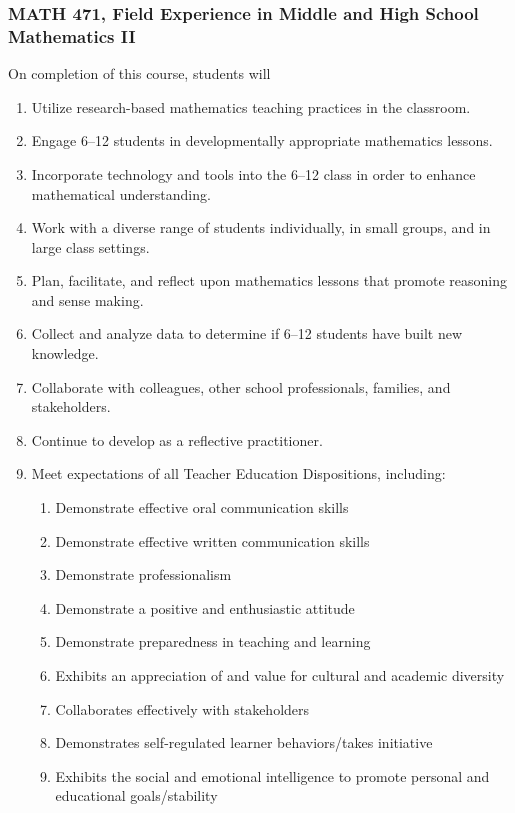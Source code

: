 \documentclass[10pt]{article}
\newenvironment{alphalist}{
\begin{enumerate}[label=(\arabic*),widest=107 ,leftmargin=25pt, itemsep=0pt]}
{\end{enumerate}}
\newenvironment{betalist}{
\begin{enumerate}[label=(\alph*),widest=zzz,leftmargin=25pt,itemsep=0pt]}
{\end{enumerate}}
\begin{document}
\subsubsection*{MATH 471, Field Experience in Middle and High School Mathematics II}

On completion of this course, students will
\begin{alphalist}
\item Utilize research-based mathematics teaching practices in the classroom.
\item Engage 6--12 students in developmentally appropriate mathematics lessons.
\item Incorporate technology and tools into the 6--12 class in order to enhance mathematical understanding.
\item Work with a diverse range of students individually, in small groups, and in large class settings.
\item Plan, facilitate, and reflect upon mathematics lessons that promote reasoning and sense making.
\item Collect and analyze data to determine if 6--12 students have built new knowledge. 
\item Collaborate with colleagues, other school professionals, families, and stakeholders.
\item Continue to develop as a reflective practitioner.
\item Meet expectations of all Teacher Education Dispositions, including:
\begin{betalist}
\item Demonstrate effective oral communication skills
\item Demonstrate effective written communication skills
\item Demonstrate professionalism
\item Demonstrate a positive and enthusiastic attitude
\item Demonstrate preparedness in teaching and learning
\item Exhibits an appreciation of and value for cultural and academic diversity
\item Collaborates effectively with stakeholders
\item Demonstrates self-regulated learner behaviors/takes initiative
\item Exhibits the social and emotional intelligence to promote personal and educational goals/stability
\end{betalist}
\end{alphalist}
\end{document}
